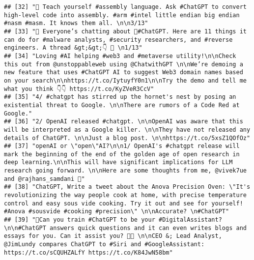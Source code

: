 \documentclass[
]{article}
\begin{document}
\begin{verbatim}
## [32] "👾 Teach yourself #assembly language. Ask #ChatGPT to convert high-level code into assembly. #arm #intel little endian big endian #nasm #masm. It knows them all. \n\n3/13"                                                                                                                                                     
## [33] "🧵 Everyone’s chatting about 🤖#ChatGPT. Here are 11 things it can do for #malware analysts, #security researchers, and #reverse engineers. A thread &gt;&gt;👇 🧵 \n1/13"                                                                                                                                                      
## [34] "Loving #AI helping #web3 and #metaverse utility!\n\nCheck this out from @unstoppableweb using @ChatwithGPT \n\nWe’re demoing a  new feature that uses #ChatGPT AI to suggest Web3 domain names based on your search\n\nhttps://t.co/IytuyfY0n1\n\nTry the demo and tell me what you think 👇👇 https://t.co/KyZVeR3CcV"         
## [35] "4/ #chatgpt has stirred up the hornet's nest by posing an existential threat to Google. \n\nThere are rumors of a Code Red at Google."                                                                                                                                                                                          
## [36] "2/ OpenAI released #chatgpt. \n\nOpenAI was aware that this will be interpreted as a Google killer. \n\nThey have not released any details of ChatGPT. \n\nJust a blog post. \n\nhttps://t.co/5xsZ1QOfOz"                                                                                                                       
## [37] "openAI or \"open\"AI?\n\n1/ OpenAI's #chatgpt release will mark the beginning of the end of the golden age of open research in deep learning.\n\nThis will have significant implications for LLM research going forward. \n\nHere are some thoughts from me, @vivek7ue and @rajhans_samdani 🧵"                                 
## [38] "ChatGPT, Write a tweet about the Anova Precision Oven: \"It's revolutionizing the way people cook at home, with precise temperature control and easy sous vide cooking. Try it out and see for yourself! #Anova #sousvide #cooking #precision\" \n\nAccurate? \n#ChatGPT"                                                       
## [39] "📱Can you train #ChatGPT to be your #DigitalAssistant? \n\n#ChatGPT answers quick questions and it can even writes blogs and essays for you. Can it assist you? 👩‍💻 \n\nCEO &; Lead Analyst, @JimLundy compares ChatGPT to #Siri and #GoogleAssistant: https://t.co/sCQUHZALfY https://t.co/K84JwN58bm"                        

\end{verbatim}
\end{document}
